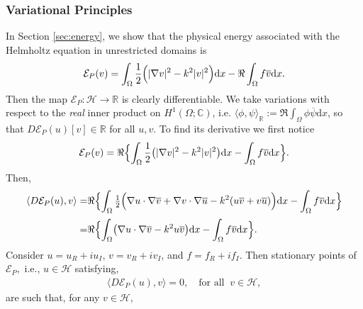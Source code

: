 \documentclass[twoside,11pt]{article}
\def\d{{\mathrm d}}
\def\R {{\mathbb R}}
\def\<{{\langle }}
\def\>{{\rangle }}
\def\ubar{\overline{u}}
\def\vbar{\overline{v}}
\def\Hc{{\mathscr H}}
\renewcommand{\R}{{\mathbb{R}}}
\begin{document}
{\subsubsection*{Variational Principles}
In Section \ref{sec:energy}, we 
show that the physical energy associated with the Helmholtz equation  {in unrestricted domains} is
\begin{equation}\label{Energy_H_main_s2}
\mathcal{E}_P(v) = \int_{\Omega }  \frac12  \Bigl(    |\nabla v |^2 - k^2|v|^2 \Bigr)   \d x  -     \Re \int_{\Omega } f   \overline{v}   \d  x   .
\end{equation}
Then the map  $\mathcal{E}_P  : \Hc \to \R $ is clearly differentiable. 
{We take variations with respect to the \emph{real} inner product on $H^1(\Omega;\mathbb{C})$, i.e. $\langle \phi,\psi\rangle_{\mathbb{R}}:=\Re \int_{\Omega}\phi \overline{\psi} \d x$, so that $D\mathcal{E}_P(u)[v]\in\mathbb{R}$ for all $u,v$.}
To find its derivative we first notice 
\begin{equation}\label{Energy_H_main_Re}
\mathcal{E}_P(v) =  \Re \Bigl\{  \int_{\Omega }  \frac12  \bigl( |\nabla v |^2 - k^2|v|^2 \bigr)  \d x  -  \int_{\Omega } f   \overline{v}   \d  x \Bigr\}. 
\end{equation}
Then, 
\begin{equation}\label{Energy_H_main_Re2}\begin{split}
\< D\mathcal{E}_P(u)  , v  \>   =&  \Re \Bigl\{  \int_{\Omega }  \tfrac12 \Bigl(   \nabla u\cdot \nabla \vbar  
+   \nabla v\cdot \nabla \ubar  - k^2( u \vbar + v \ubar ) \Bigr) \d x  -  \int_{\Omega } f   \overline{v}   \d  x \Bigr\}\\[2pt]
 = &  \Re \Bigl\{  \int_{\Omega }   \bigl( \nabla u\cdot \nabla \vbar  - k^2 u \vbar \bigr)   \d x  -  \int_{\Omega } f   \overline{v}   \d  x \Bigr\}.
\end{split}
\end{equation}
 Consider {  $u= u_R + i u_I $, $v= v_R + i v_I$, and $f = f_R + i f_I$}. 
Then stationary points of $ \mathcal{E}_P, $ i.e., $u\in \Hc $ satisfying,
\begin{equation}\label{Energy_H_main_stat_p}\begin{split}
\< D\mathcal{E}_P(u)  , v  \>  =   0, \quad \text{for all } \ v \in \Hc   , \end{split}
\end{equation}
are such that, for any $v\in \Hc , $
\begin{equation}\label{Energy_H_main_Re_system}
\begin{split}

\end{split}
\end{equation}}
\end{document}
